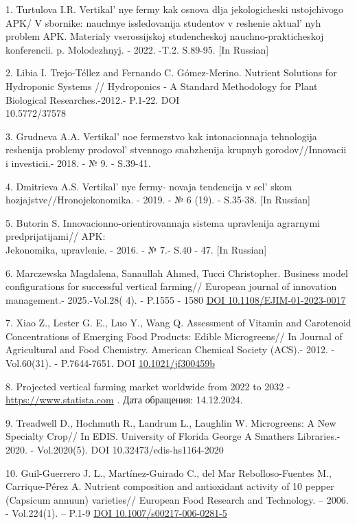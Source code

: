 \begin{references}
1. Turtulova I.R. Vertikal' nye fermy kak osnova dlja
jekologicheski ustojchivogo APK/ V sbornike: nauchnye issledovanija
studentov v reshenie aktual' nyh problem APK. Materialy
vserossijskoj studench\-eskoj nauchno-prakticheskoj konferencii. p.
Molodezhnyj. - 2022. -T.2. S.89-95. {[}In Russian{]}

2. Libia I. Trejo-Téllez and Fernando C. Gómez-Merino. Nutrient Solutions
for Hydroponic Systems // Hydroponics - A Standard Methodology for Plant
Biological Researches.-2012.- P.1-22. DOI \\10.5772/37578

3. Grudneva A.A. Vertikal' noe fermerstvo kak
intonacionnaja tehnologija reshenija problemy
prodovol' stvennogo snabzhenija krupnyh
gorodov//Innovacii i investicii.- 2018. - № 9. - S.39-41.

4. Dmitrieva A.S. Vertikal' nye fermy- novaja tendencija v
sel' skom hozjajstve//Hronojekonomika. - 2019. - № 6
(19). - S.35-38. {[}In Russian{]}

5. Butorin S. Innovacionno-orientirovannaja sistema upravlenija
agrarnymi predprijatijami// APK: \\Jekonomika, upravlenie. - 2016. - № 7.-
S.40 - 47. {[}In Russian{]}

6. Marczewska Magdalena, Sanaullah Ahmed, Tucci Christopher. Business
model configurations for suc\-cessful vertical farming// European journal
of innovation management.- 2025.-Vol.28( 4). - P.1555 - 1580
\href{http://dx.doi.org/10.1108/EJIM-01-2023-0017}{DOI 10.1108/EJIM-01-2023-0017}

7. Xiao Z., Lester G. E., Luo Y., Wang Q. Assessment of Vitamin and
Carotenoid Concentrations of Emerging Food Products: Edible
Microgreens// In Journal of Agricultural and Food Chemistry. American
Chemical Society (ACS).- 2012. -Vol.60(31). - P.7644-7651. DOI
\href{https://doi.org/10.1021/jf300459b}{10.1021/jf300459b}

8. Projected vertical farming market worldwide from 2022 to 2032 -
\href{https://www.statista.com/statistics/487666/projection-vertical-farming-market-worldwide/}{https://www.statista.com}
. Дата обращения: 14.12.2024.

9. Treadwell D., Hochmuth R., Landrum L., Laughlin W. Microgreens: A New
Specialty Crop// In EDIS. University of Florida George A Smathers
Libraries.- 2020. - Vol.2020(5). DOI 10.32473/edis-hs1164-2020

10. Guil-Guerrero J. L., Martínez-Guirado C., del Mar Rebolloso-Fuentes
M., Carrique-Pérez A. Nutrient composition and antioxidant activity of
10 pepper (Capsicum annuun) varieties// European Food Research and
Technology. -- 2006. - Vol.224(1). -- P.1-9
\href{https://doi.org/10.1007/s00217-006-0281-5}{DOI
10.1007/s00217-006-0281-5}


\end{references}
